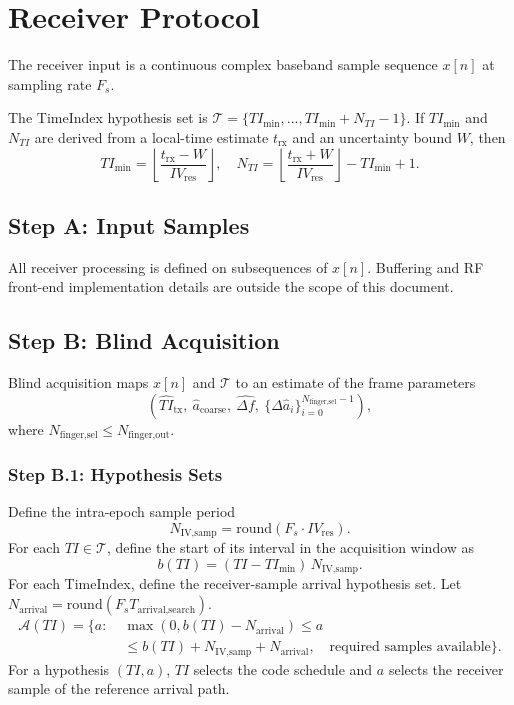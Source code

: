 \documentclass[11pt]{article}
\begin{document}
\section{Receiver Protocol}\label{sec:receiver}

The receiver input is a continuous complex baseband sample sequence $x[n]$ at sampling rate $F_s$.

The TimeIndex hypothesis set is $\mathcal{T}=\{\mathit{TI}_{\min},\dots,\mathit{TI}_{\min}+N_{\mathit{TI}}-1\}$. If $\mathit{TI}_{\min}$ and $N_{\mathit{TI}}$ are derived from a local-time estimate $t_{\text{rx}}$ and an uncertainty bound $W$, then
\[
  \mathit{TI}_{\min}=\left\lfloor \frac{t_{\text{rx}}-W}{\mathit{IV}_{\text{res}}}\right\rfloor,\quad
  N_{\mathit{TI}}=\left\lfloor \frac{t_{\text{rx}}+W}{\mathit{IV}_{\text{res}}}\right\rfloor-\mathit{TI}_{\min}+1.
\]

\subsection{Step A: Input Samples}

All receiver processing is defined on subsequences of $x[n]$. Buffering and RF front-end implementation details are outside the scope of this document.

\subsection{Step B: Blind Acquisition}

Blind acquisition maps $x[n]$ and $\mathcal{T}$ to an estimate of the frame parameters
\[
  \left(\widehat{\mathit{TI}}_{\text{tx}},\ \hat a_{\text{coarse}},\ \widehat{\Delta f},\ \{\Delta\hat a_i\}_{i=0}^{N_{\text{finger,sel}}-1}\right),
\]
where $N_{\text{finger,sel}}\le N_{\text{finger,out}}$.

\subsubsection{Step B.1: Hypothesis Sets}

Define the intra-epoch sample period
\[
  N_{\text{IV,samp}}=\mathrm{round}(F_s\cdot \mathit{IV}_{\text{res}}).
\]
For each $\mathit{TI}\in\mathcal{T}$, define the start of its interval in the acquisition
window as
\[
  b(\mathit{TI})=(\mathit{TI}-\mathit{TI}_{\min})\,N_{\text{IV,samp}}.
\]
For each TimeIndex, define the receiver-sample arrival hypothesis set. Let
$N_{\text{arrival}}=\mathrm{round}(F_s T_{\text{arrival,search}})$.
\[
  \begin{aligned}
  \mathcal{A}(\mathit{TI})=\{a:\;&\max(0,b(\mathit{TI})-N_{\text{arrival}})\le a\\
  &\le b(\mathit{TI})+N_{\text{IV,samp}}+N_{\text{arrival}},\quad
  \text{required samples available}\}.
  \end{aligned}
\]
For a hypothesis $(\mathit{TI},a)$, $\mathit{TI}$ selects the code schedule and $a$ selects the
receiver sample of the reference arrival path.
\end{document}
